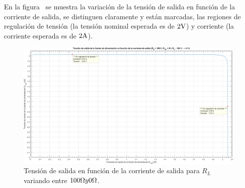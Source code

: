 
\vspace{1.5cm}


En la figura~ se muestra la variación de la tensión de salida en función de la corriente de salida, se distinguen claramente y están marcadas, las regiones de regulación de tensión (la tensión nominal esperada es de $2 \si[per-mode=symbol]{\volt}$) y corriente (la corriente esperada es de $2 \si[per-mode=symbol]{\ampere}$).




\vfill

\clearpage

\begin{figure}[H] %
\begin{center}
\includegraphics[width=1.2 \textwidth, angle=90]{./img/preguntas/p15.png}
\caption{\label{fig:fig_p15_voltage_vs_current}\footnotesize{Tensión de salida en función de la corriente de salida para $R_{L}$ variando entre $100 \si[per-mode=symbol]{\ohm} y 0 \si[per-mode=symbol]{\ohm}$.}}
\end{center}
\end{figure}



\clearpage
